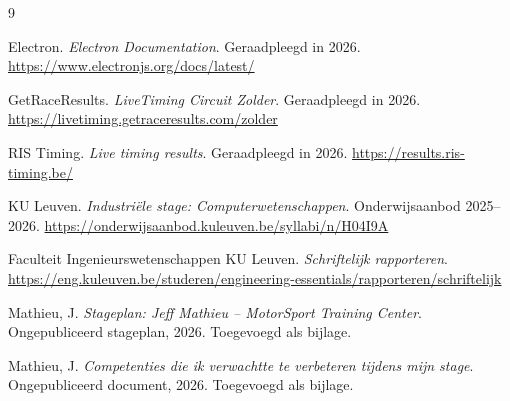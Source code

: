 \begin{thebibliography}{9}

Electron. \textit{Electron Documentation}. Geraadpleegd in 2026. \url{https://www.electronjs.org/docs/latest/}

GetRaceResults. \textit{LiveTiming Circuit Zolder}. Geraadpleegd in 2026. \url{https://livetiming.getraceresults.com/zolder}

RIS Timing. \textit{Live timing results}. Geraadpleegd in 2026. \url{https://results.ris-timing.be/}

KU Leuven. \textit{Industriële stage: Computerwetenschappen}. Onderwijsaanbod 2025--2026. \url{https://onderwijsaanbod.kuleuven.be/syllabi/n/H04I9A}

Faculteit Ingenieurswetenschappen KU Leuven. \textit{Schriftelijk rapporteren}. \url{https://eng.kuleuven.be/studeren/engineering-essentials/rapporteren/schriftelijk}

Mathieu, J. \textit{Stageplan: Jeff Mathieu -- MotorSport Training Center}. Ongepubliceerd stageplan, 2026. Toegevoegd als bijlage.

Mathieu, J. \textit{Competenties die ik verwachtte te verbeteren tijdens mijn stage}. Ongepubliceerd document, 2026. Toegevoegd als bijlage.

\end{thebibliography}


